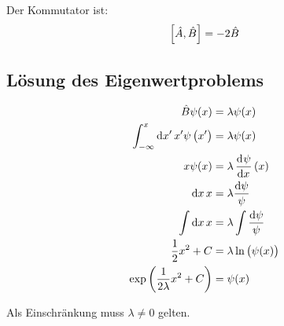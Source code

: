 Der Kommutator ist:
\[
	\sbr{\hat A, \hat B}
	=
	- 2 \hat B
\]


\subsection{Lösung des Eigenwertproblems}

\begin{align*}
	\hat B \psi(x) &= \lambda \psi(x) \\
	\int_{-\infty}^x \dif{x'} \, x' \psi\del{x'} &= \lambda \psi(x) \\
	x \psi(x) &= \lambda \dod\psi x(x) \\
	\dif x \, x &= \lambda \frac{\dif \psi}{\psi} \\
	\int \dif x \, x &= \lambda \int \frac{\dif \psi}{\psi} \\
	\half x^2 + C &= \lambda \ln\del{\psi(x)} \\
	\exp\del{\frac{1}{2\lambda} x^2 + C} &= \psi(x)
\end{align*}

Als Einschränkung muss $\lambda \neq 0$ gelten.


\IfFileExists{\bibliographyfile}{
	
}{}



